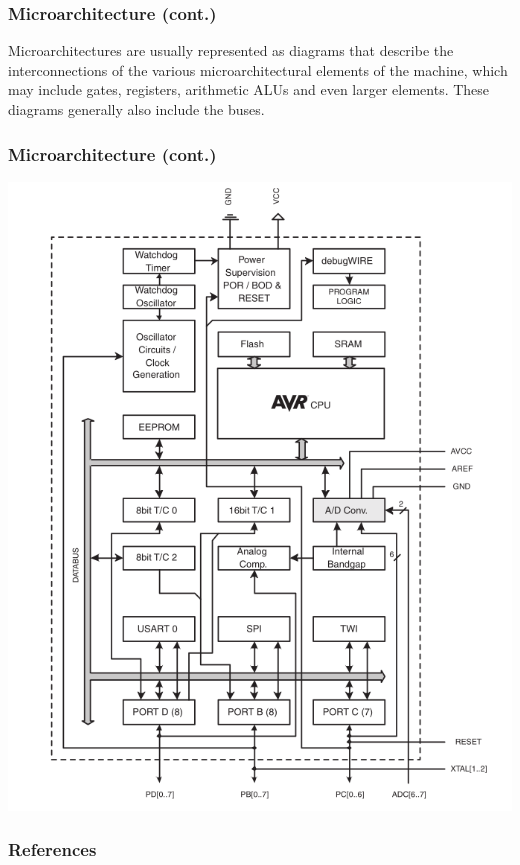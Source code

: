 \documentclass[aspectratio=169]{beamer}
\begin{document}

\begin{frame}
  \frametitle{Microarchitecture (cont.)}
  Microarchitectures are usually represented as diagrams that describe the interconnections of the various microarchitectural elements of the machine, which may include gates, registers, arithmetic ALUs and even larger elements. These diagrams generally also include the buses.
\end{frame}

\begin{frame}
  \frametitle{Microarchitecture (cont.)}
  \centering
  \includegraphics[height=0.9\textheight]{328p_uarch.png}
\end{frame}

\begin{frame}
    \frametitle{References}
    \printbibliography
\end{frame}
\end{document}
